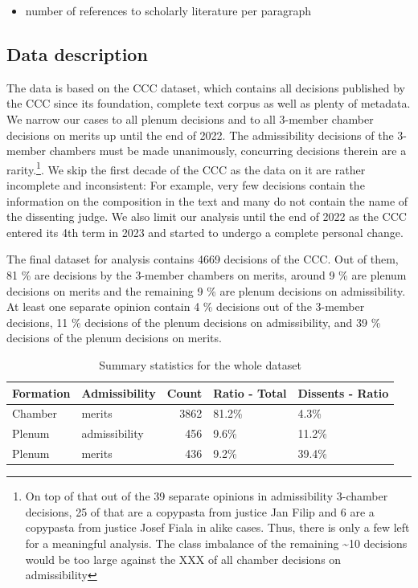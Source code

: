 \documentclass[
  11pt,
]{article}
\providecommand{\tightlist}{%
  \setlength{\itemsep}{0pt}\setlength{\parskip}{0pt}}
\begin{document}
\begin{itemize}
\begin{itemize}
    \begin{itemize}
    \tightlist
    \item
      number of references to scholarly literature per paragraph
    \end{itemize}
  \end{itemize}
\end{itemize}

\hypertarget{data-description}{%
\subsection{Data description}\label{data-description}}

The data is based on the CCC dataset, which contains all decisions
published by the CCC since its foundation, complete text corpus as well
as plenty of metadata. We narrow our cases to all plenum decisions and
to all 3-member chamber decisions on merits up until the end of 2022.
The admissibility decisions of the 3-member chambers must be made
unanimously, concurring decisions therein are a rarity.\footnote{On top
  of that out of the 39 separate opinions in admissibility 3-chamber
  decisions, 25 of that are a copypasta from justice Jan Filip and 6 are
  a copypasta from justice Josef Fiala in alike cases. Thus, there is
  only a few left for a meaningful analysis. The class imbalance of the
  remaining \textasciitilde10 decisions would be too large against the
  XXX of all chamber decisions on admissibility}. We skip the first
decade of the CCC as the data on it are rather incomplete and
inconsistent: For example, very few decisions contain the information on
the composition in the text and many do not contain the name of the
dissenting judge. We also limit our analysis until the end of 2022 as
the CCC entered its 4th term in 2023 and started to undergo a complete
personal change.

The final dataset for analysis contains 4669 decisions of the CCC. Out
of them, 81 \% are decisions by the 3-member chambers on merits, around
9 \% are plenum decisions on merits and the remaining 9 \% are plenum
decisions on admissibility. At least one separate opinion contain 4 \%
decisions out of the 3-member decisions, 11 \% decisions of the plenum
decisions on admissibility, and 39 \% decisions of the plenum decisions
on merits.

\begin{table}

\caption{\label{tab:unnamed-chunk-1}Summary statistics for the whole dataset}
\centering
\begin{tabular}[t]{l|l|r|l|l}
\hline
\textbf{Formation} & \textbf{Admissibility} & \textbf{Count} & \textbf{Ratio - Total} & \textbf{Dissents - Ratio}\\
\hline
Chamber & merits & 3862 & 81.2\% & 4.3\%\\
\hline
Plenum & admissibility & 456 & 9.6\% & 11.2\%\\
\hline
Plenum & merits & 436 & 9.2\% & 39.4\%\\
\hline
\end{tabular}
\end{table}
\end{document}
